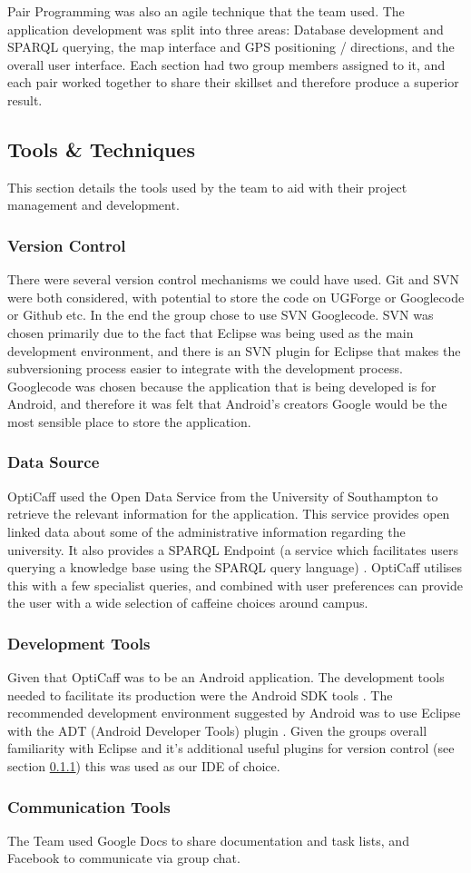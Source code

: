 Pair Programming was also an agile technique that the team used. The application development was split into three areas: Database development and SPARQL querying, the map interface and GPS positioning / directions, and the overall user interface. Each section had two group members assigned to it, and each pair worked together to share their skillset and therefore produce a superior result. 

\subsection{Tools \& Techniques}
This section details the tools used by the team to aid with their project management and development.

\subsubsection{Version Control}
\label{sec:VersionControl}
There were several version control mechanisms we could have used. Git and SVN were both considered, with potential to store the code on UGForge or Googlecode or Github etc. In the end the group chose to use SVN Googlecode. SVN was chosen primarily due to the fact that Eclipse was being used as the main development environment, and there is an SVN plugin for Eclipse that makes the subversioning process easier to integrate with the development process. Googlecode was chosen because the application that is being developed is for Android, and therefore it was felt that Android’s creators Google would be the most sensible place to store the application. 

\subsubsection{Data Source}
OptiCaff used the Open Data Service from the University of Southampton \cite{DataSouthampton} to retrieve the relevant information for the application. This service provides open linked data about some of the administrative information regarding the university. It also provides a SPARQL Endpoint \cite{SotonSparql} (a service which facilitates users querying a knowledge base using the SPARQL query language) \cite{SparqlEndpoint}. OptiCaff utilises this with a few specialist queries, and combined with user preferences can provide the user with a wide selection of caffeine choices around campus. 

\subsubsection{Development Tools}
Given that OptiCaff was to be an Android application. The development tools needed to facilitate its production were the Android SDK tools \cite{AndroidSDK}. The recommended development environment suggested by Android was to use Eclipse \cite{Eclipse} with the ADT (Android Developer Tools) plugin \cite{SDKAllOS}. Given the groups overall familiarity with Eclipse and it’s additional useful plugins for version control (see section \ref{sec:VersionControl}) this was used as our IDE of choice.

\subsubsection{Communication Tools}
The Team used Google Docs to share documentation and task lists, and Facebook to communicate via group chat. 
